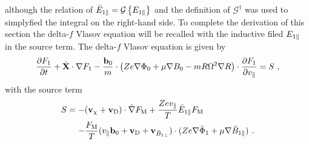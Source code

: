 although the relation of $\bar{E}_{1\parallel} =  \mathcal{G} \left\{E_{1\parallel}\right\}$ and the definition of $\mathcal{G}^\dagger$ was used to simplyfied the integral on the right-hand side. To complete the derivation of this section the delta-\!$f$ Vlasov equation will be recalled with the inductive filed $E_{1\parallel}$ in the source term. The delta-\!$f$ Vlasov equation is given by
\begin{gather}
	\frac{\partial F_1}{\partial t} + \dot{\boldsymbol{\mathbf{X}}} \cdot \nabla F_1 - \frac{\boldsymbol{\mathbf{b}}_0}{m} \cdot \left(Ze\nabla \Phi_0 + \mu \nabla B_0 - mR \Omega^2 \nabla R \right) \cdot \frac{\partial F_1}{\partial v_\parallel} = S~,
	\label{eq:gyrocenterDeltafSubVlasovRecall}
\end{gather}
with the source term
\begin{gather}
	\begin{aligned}
		S = -& (\boldsymbol{\mathbf{v}}_\chi + \boldsymbol{\mathbf{v}}_\mathrm{D}) \cdot \tilde{\nabla} F_\mathrm{M} + \frac{Z e v_\parallel}{T} \bar{E}_{1\parallel} F_\mathrm{M} \\
		    -& \frac{F_\mathrm{M}}{T} (v_\parallel \boldsymbol{\mathbf{b}}_0 + \boldsymbol{\mathbf{v}}_\mathrm{D} + \boldsymbol{\mathbf{v}}_{\bar{B}_{1\perp}}) \cdot (Z e \nabla \bar{\Phi}_1 + \mu \nabla \bar{B}_{1\parallel})~.
	\end{aligned}
	\label{eq:sourceTermElectric}
\end{gather}

